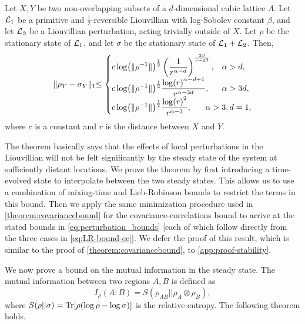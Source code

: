 \begin{theorem}
\label{thm:stability_results}
Let $X,Y$ be two non-overlapping subsets of a $d$-dimensional cubic lattice $\Lambda$.  Let $\mathcal{L}_1 $  be a primitive and $\frac12$-reversible Liouvillian with log-Sobolev constant $\beta$, and let $\mathcal{L}_2$ be a Liouvillian perturbation, acting trivially outside of $X$. Let $\rho$ be the stationary state of $\mathcal{L}_1$, and let $\sigma$ be the stationary state of $\mathcal{L}_1  + \mathcal{L}_2$. Then,
\begin{equation}
\label{eq:perturbation_bounds}
\lVert \rho_Y - \sigma_Y  \lVert_1 \leq
\begin{cases}
    \ds c \log (  \lVert \rho^{-1}  \lVert)^{\frac12} \left(\frac1{r^{\alpha - d}} \right)^{\frac{2 \beta}{ v + 2\beta}},& \al > d,
    \\ \ds c \log (  \lVert \rho^{-1}  \lVert)^{\frac12} \frac{\log(r)^{\al-d+1}}{r^{\al-3d}},& \al > 3d,
    \\ \ds c \log (  \lVert \rho^{-1}  \lVert)^{\frac12} \frac{\log(r)^2}{r^{\al-3}},& \hspace{-2em}\al> 3, d=1,
\end{cases}
\end{equation}
where $c$ is a constant and $r$ is the distance between $X$ and $Y$.
\end{theorem}

The theorem basically says that the effects of local perturbations in the Liouvillian will not be felt significantly by the steady state of the system at sufficiently distant locations.
We prove the theorem by first introducing a time-evolved state to interpolate between the two steady states.
This allows us to use a combination of mixing-time and Lieb-Robinson bounds to restrict the terms in this bound.
Then we apply the same minimization procedure used in \cref{theorem:covariancebound} for the covariance-correlations bound to arrive at the stated bounds in \cref{eq:perturbation_bounds} [each of which follow directly from the three cases in \cref{eq:LR-bound-cc}].
We defer the proof of this result, which is similar to the proof of \cref{theorem:covariancebound}, to \cref{app:proof-stability}.

We now prove a bound on the mutual information in the steady state.  The mutual information between two regions $A,B$ is defined as
\begin{equation}
I_\rho(A:B) = S(\rho_{AB} || \rho_A \otimes \rho_B),
\end{equation}
where $S(\rho || \sigma )= \text{Tr}[\rho ( \log \rho - \log \sigma)]$ is the relative entropy. The following theorem holds.

